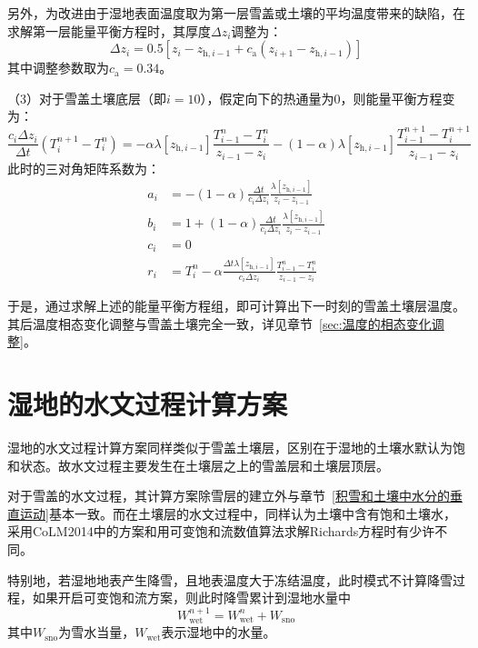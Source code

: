 另外，为改进由于湿地表面温度取为第一层雪盖或土壤的平均温度带来的缺陷，在求解第一层能量平衡方程时，其厚度$\Delta z_i$调整为：
\begin{equation}
  \Delta z_i = 0.5\left[z_i-z_{\mathrm{h},i-1}+c_{\mathrm {a}} \left(z_{i+1}-z_{\mathrm{h},i-1}\right)\right]
\end{equation}
其中调整参数取为$c_{\mathrm {a}} =0.34$。

（3）对于雪盖土壤底层（即$i=10$），假定向下的热通量为0，则能量平衡方程变为：
\begin{equation}
  \frac{c_{i} \Delta z_{i}}{\Delta t}\left(T_{i}^{n+1}-T_{i}^{n}\right)=-\alpha \lambda\left[z_{\mathrm{h},i-1}\right] \frac{T_{i-1}^{n}-T_{i}^{n}}{z_{i-1}-z_{i}}-(1-\alpha) \lambda\left[z_{\mathrm{h},i-1}\right] \frac{T_{i-1}^{n+1}-T_{i}^{n+1}}{z_{i-1}-z_{i}}
\end{equation}
此时的三对角矩阵系数为：
\begin{equation}
  \begin{aligned}
    a_{i} &= -(1-\alpha) \frac{\Delta t}{c_{i} \Delta z_{i}} \frac{\lambda\left[z_{\mathrm{h},i-1}\right]}{z_{i}-z_{i-1}} \\
    b_{i} &= 1+(1-\alpha) \frac{\Delta t}{c_{i} \Delta z_{i}} \frac{\lambda\left[z_{\mathrm{h},i-1}\right]}{z_{i}-z_{i-1}} \\
    c_{i} &= 0 \\
    r_{i} &= T_{i}^{n}-\alpha \frac{\Delta t \lambda\left[z_{\mathrm{h},i-1}\right]}{c_{i} \Delta z_{i}} \frac{T_{i-1}^{n}-T_{i}^{n}}{z_{i-1}-z_{i}}
  \end{aligned}
\end{equation}

于是，通过求解上述的能量平衡方程组，即可计算出下一时刻的雪盖土壤层温度。其后温度相态变化调整与雪盖土壤完全一致，详见章节~\ref{sec:温度的相态变化调整}。


\section{湿地的水文过程计算方案}
湿地的水文过程计算方案同样类似于雪盖土壤层，区别在于湿地的土壤水默认为饱和状态。故水文过程主要发生在土壤层之上的雪盖层和土壤层顶层。

对于雪盖的水文过程，其计算方案除雪层的建立外与章节~\ref{积雪和土壤中水分的垂直运动}基本一致。而在土壤层的水文过程中，同样认为土壤中含有饱和土壤水，采用CoLM2014中的方案和用可变饱和流数值算法求解Richards方程时有少许不同。

特别地，若湿地地表产生降雪，且地表温度大于冻结温度，此时模式不计算降雪过程，如果开启可变饱和流方案，则此时降雪累计到湿地水量中
\begin{equation}
  W_{\mathrm{wet}}^{n+1}=W_{\mathrm{wet}}^{n}+W_{\mathrm{sno}}
\end{equation}
其中$W_{\mathrm{sno}}$为雪水当量，$W_{\mathrm{wet}}$表示湿地中的水量。\\

